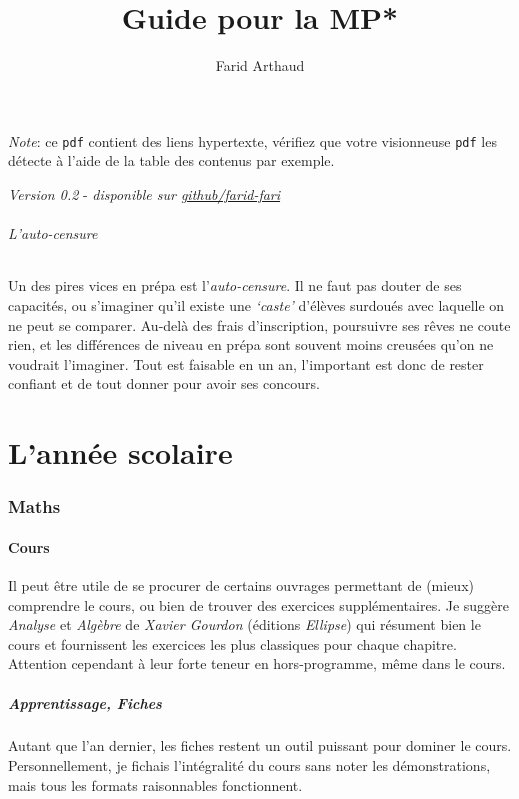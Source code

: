 \documentclass{article}
\begin{document}
\title{Guide pour la MP*}
\author{Farid Arthaud}
\maketitle
\tableofcontents

\textit{Note}: ce \texttt{pdf} contient des liens hypertexte, vérifiez que votre visionneuse \texttt{pdf} les détecte à l'aide de la table des contenus par exemple.

\textit{Version 0.2} - \textit{disponible sur \href{https://github.com/farid-fari/guideprepa}{github/farid-fari}}

\paragraph{L'auto-censure}\mbox{}\newline
Un des pires vices en prépa est l'\textit{auto-censure}.
Il ne faut pas douter de ses capacités, ou s'imaginer qu'il existe une \textit{`caste'} d'élèves surdoués avec laquelle on ne peut se comparer.
Au-delà des frais d'inscription, poursuivre ses rêves ne coute rien, et les différences de niveau en prépa sont souvent moins creusées qu'on ne voudrait l'imaginer.
Tout est faisable en un an, l'important est donc de rester confiant et de tout donner pour avoir ses concours.

\part{L'année scolaire}
\section{Maths}
\subsection{Cours}
Il peut être utile de se procurer de certains ouvrages permettant de (mieux) comprendre le cours, ou bien de trouver des exercices supplémentaires.
Je suggère \textit{Analyse} et \textit{Algèbre} de \textit{Xavier Gourdon} (éditions \textit{Ellipse}) qui résument bien le cours et fournissent les exercices les plus classiques pour chaque chapitre.
Attention cependant à leur forte teneur en hors-programme, même dans le cours.

\subsubsection{Apprentissage, Fiches}
Autant que l'an dernier, les fiches restent un outil puissant pour dominer le cours.
Personnellement, je fichais l'intégralité du cours sans noter les démonstrations, mais tous les formats raisonnables fonctionnent.
\end{document}
